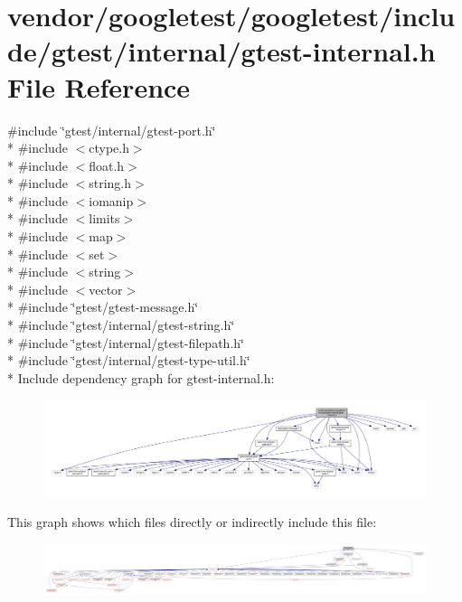 \hypertarget{gtest-internal_8h}{}\section{vendor/googletest/googletest/include/gtest/internal/gtest-\/internal.h File Reference}
\label{gtest-internal_8h}
{\ttfamily \#include \char`\"{}gtest/internal/gtest-\/port.\+h\char`\"{}}\\*
{\ttfamily \#include $<$ctype.\+h$>$}\\*
{\ttfamily \#include $<$float.\+h$>$}\\*
{\ttfamily \#include $<$string.\+h$>$}\\*
{\ttfamily \#include $<$iomanip$>$}\\*
{\ttfamily \#include $<$limits$>$}\\*
{\ttfamily \#include $<$map$>$}\\*
{\ttfamily \#include $<$set$>$}\\*
{\ttfamily \#include $<$string$>$}\\*
{\ttfamily \#include $<$vector$>$}\\*
{\ttfamily \#include \char`\"{}gtest/gtest-\/message.\+h\char`\"{}}\\*
{\ttfamily \#include \char`\"{}gtest/internal/gtest-\/string.\+h\char`\"{}}\\*
{\ttfamily \#include \char`\"{}gtest/internal/gtest-\/filepath.\+h\char`\"{}}\\*
{\ttfamily \#include \char`\"{}gtest/internal/gtest-\/type-\/util.\+h\char`\"{}}\\*
Include dependency graph for gtest-\/internal.h\+:
\nopagebreak
\begin{figure}[H]
\begin{center}
\leavevmode
\includegraphics[width=350pt]{gtest-internal_8h__incl}
\end{center}
\end{figure}
This graph shows which files directly or indirectly include this file\+:
\nopagebreak
\begin{figure}[H]
\begin{center}
\leavevmode
\includegraphics[width=350pt]{gtest-internal_8h__dep__incl}
\end{center}
\end{figure}

